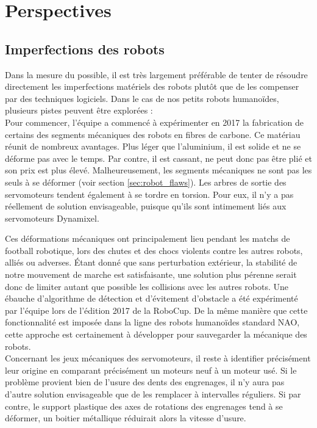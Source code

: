 
\section{Perspectives\label{sec:perspectives}}

\subsection{Imperfections des robots}

Dans la mesure du possible, il est très largement préférable 
de tenter de résoudre directement les imperfections matériels des robots
plutôt que de les compenser par des techniques logiciels.
Dans le cas de nos petits robots humanoïdes, plusieurs 
pistes peuvent être explorées :\\

Pour commencer, l'équipe a commencé à expérimenter en 2017 la fabrication
de certains des segments mécaniques des robots en fibres de carbone.
Ce matériau réunit de nombreux avantages.
Plus léger que l'aluminium, il est solide et ne se déforme pas avec le temps.
Par contre, il est cassant, ne peut donc pas être plié et son prix est plus élevé.
Malheureusement, les segments mécaniques ne sont pas les seuls à se déformer
(voir section \ref{sec:robot_flaws}).
Les arbres de sortie des servomoteurs tendent également à se tordre en torsion.
Pour eux, il n'y a pas réellement de solution envisageable, puisque qu'ils 
sont intimement liés aux servomoteurs Dynamixel.

Ces déformations mécaniques ont principalement lieu
pendant les matchs de football robotique,
lors des chutes et des chocs violents contre les autres robots,
alliés ou adverses.
Étant donné que sans perturbation extérieur, 
la stabilité de notre mouvement de marche est satisfaisante, 
une solution plus pérenne serait donc de limiter autant 
que possible les collisions avec les autres robots.
Une ébauche d'algorithme de détection et d'évitement d'obstacle
a été expérimenté par l'équipe lors de l'édition 2017 de la RoboCup.
De la même manière que cette fonctionnalité est imposée dans la ligne des
robots humanoïdes standard NAO, cette approche est certainement 
à développer pour sauvegarder la mécanique des robots.\\

Concernant les jeux mécaniques des servomoteurs, il reste à identifier
précisément leur origine en comparant précisément 
un moteurs neuf à un moteur usé.
Si le problème provient bien de l'usure des dents des engrenages, 
il n'y aura pas d'autre solution envisageable que de les remplacer 
à intervalles réguliers.
Si par contre, le support plastique des axes de rotations des
engrenages tend à se déformer, un boitier métallique réduirait
alors la vitesse d'usure.\\

